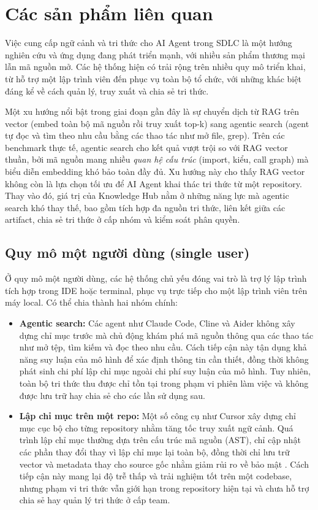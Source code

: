 \section{Các sản phẩm liên quan}

Việc cung cấp ngữ cảnh và tri thức cho AI Agent trong SDLC là một hướng nghiên cứu và ứng dụng đang phát triển mạnh, với nhiều sản phẩm thương mại lẫn mã nguồn mở. Các hệ thống hiện có trải rộng trên nhiều quy mô triển khai, từ hỗ trợ một lập trình viên đến phục vụ toàn bộ tổ chức, với những khác biệt đáng kể về cách quản lý, truy xuất và chia sẻ tri thức.

Một xu hướng nổi bật trong giai đoạn gần đây là sự chuyển dịch từ RAG trên vector (embed toàn bộ mã nguồn rồi truy xuất top-k) sang agentic search (agent tự đọc và tìm theo nhu cầu bằng các thao tác như mở file, grep). Trên các benchmark thực tế, agentic search cho kết quả vượt trội so với RAG vector thuần, bởi mã nguồn mang nhiều \textit{quan hệ cấu trúc} (import, kiểu, call graph) mà biểu diễn embedding khó bảo toàn đầy đủ. Xu hướng này cho thấy RAG vector không còn là lựa chọn tối ưu để AI Agent khai thác tri thức từ một repository. Thay vào đó, giá trị của Knowledge Hub nằm ở những năng lực mà agentic search khó thay thế, bao gồm tích hợp đa nguồn tri thức, liên kết giữa các artifact, chia sẻ tri thức ở cấp nhóm và kiểm soát phân quyền.

\subsection{Quy mô một người dùng (single user)}

Ở quy mô một người dùng, các hệ thống chủ yếu đóng vai trò là trợ lý lập trình tích hợp trong IDE hoặc terminal, phục vụ trực tiếp cho một lập trình viên trên máy local. Có thể chia thành hai nhóm chính:
\begin{itemize}
    \item \textbf{Agentic search:} Các agent như Claude Code, Cline và Aider không xây dựng chỉ mục trước mà chủ động khám phá mã nguồn thông qua các thao tác như mở tệp, tìm kiếm và đọc theo nhu cầu. Cách tiếp cận này tận dụng khả năng suy luận của mô hình để xác định thông tin cần thiết, đồng thời không phát sinh chi phí lập chỉ mục ngoài chi phí suy luận của mô hình. Tuy nhiên, toàn bộ tri thức thu được chỉ tồn tại trong phạm vi phiên làm việc và không được lưu trữ hay chia sẻ cho các lần sử dụng sau.
    \item \textbf{Lập chỉ mục trên một repo:} Một số công cụ như Cursor xây dựng chỉ mục cục bộ cho từng repository nhằm tăng tốc truy xuất ngữ cảnh. Quá trình lập chỉ mục thường dựa trên cấu trúc mã nguồn (AST), chỉ cập nhật các phần thay đổi thay vì lập chỉ mục lại toàn bộ, đồng thời chỉ lưu trữ vector và metadata thay cho source gốc nhằm giảm rủi ro về bảo mật \cite{cursor_secure_indexing}. Cách tiếp cận này mang lại độ trễ thấp và trải nghiệm tốt trên một codebase, nhưng phạm vi tri thức vẫn giới hạn trong repository hiện tại và chưa hỗ trợ chia sẻ hay quản lý tri thức ở cấp team.
\end{itemize}

